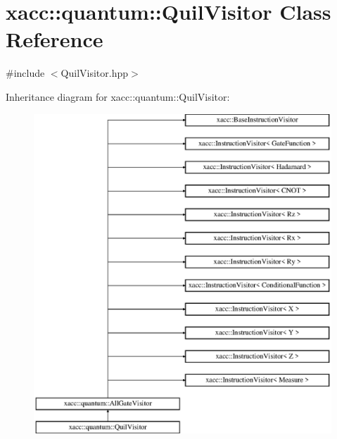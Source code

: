 \hypertarget{a00051}{}\section{xacc\+:\+:quantum\+:\+:Quil\+Visitor Class Reference}
\label{a00051}


{\ttfamily \#include $<$Quil\+Visitor.\+hpp$>$}

Inheritance diagram for xacc\+:\+:quantum\+:\+:Quil\+Visitor\+:\begin{figure}[H]
\begin{center}
\leavevmode
\includegraphics[height=12.000000cm]{a00051}
\end{center}
\end{figure}
